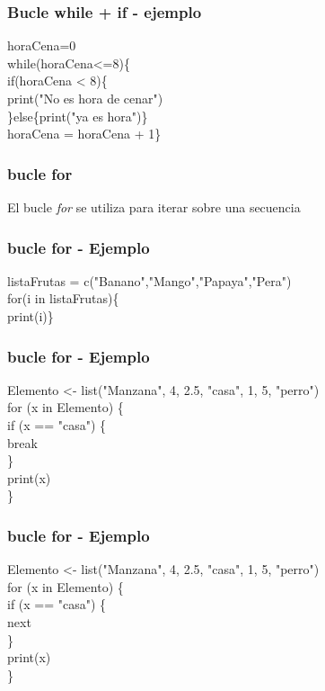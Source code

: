 \documentclass[11pt]{beamer}
\begin{document}
	\begin{frame}
		\frametitle{Bucle while + if - ejemplo}
		
		horaCena=0\\
		
		while(horaCena<=8)\{\\
			if(horaCena < 8)\{\\
				print("No es hora de cenar")\\
			\}else\{print("ya es hora")\}\\
			horaCena = horaCena + 1\}
		
	\end{frame}

	\begin{frame}
		\frametitle{bucle for}
		El bucle \textit{for} se utiliza para iterar sobre una secuencia
	\end{frame}

	\begin{frame}
	\frametitle{bucle for - Ejemplo}
	listaFrutas = c("Banano","Mango","Papaya","Pera")\\
	
	for(i in listaFrutas)\{\\
		print(i)\}\\
	
\end{frame}

\begin{frame}
	\frametitle{bucle for - Ejemplo}
	Elemento <- list("Manzana", 4, 2.5, "casa", 1, 5, "perro")\\
	
	for (x in Elemento) \{\\
		if (x == "casa") \{\\
			break\\
		\}\\
		print(x)\\
	\}
	
\end{frame}

\begin{frame}
	\frametitle{bucle for - Ejemplo}
	Elemento <- list("Manzana", 4, 2.5, "casa", 1, 5, "perro")\\
	
	for (x in Elemento) \{\\
		if (x == "casa") \{\\
			next\\
		\}\\
		print(x)\\
	\}
	
\end{frame}
\end{document}
